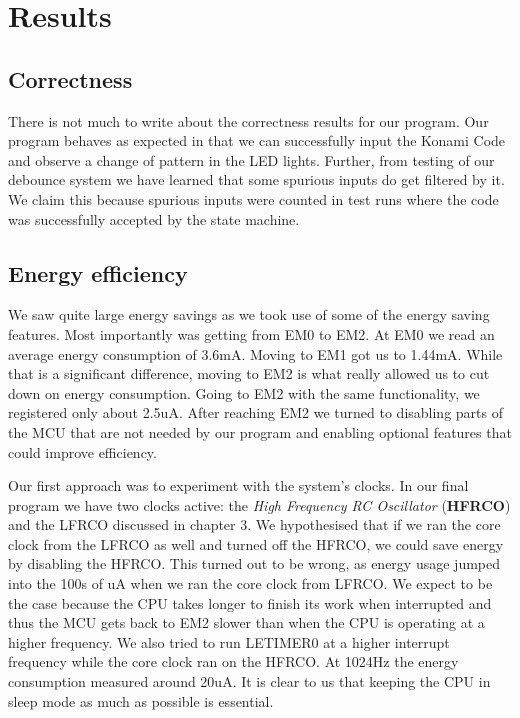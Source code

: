 \chapter{Results}

\section{Correctness}

There is not much to write about the correctness results for our program. Our
program behaves as expected in that we can successfully input the Konami Code
and observe a change of pattern in the LED lights. Further, from testing of our
debounce system we have learned that some spurious inputs do get filtered by it.
We claim this because spurious inputs were counted in test runs where the code
was successfully accepted by the state machine.

\section{Energy efficiency}

We saw quite large energy savings as we took use of some of the energy saving
features. Most importantly was getting from EM0 to EM2. At EM0 we read an
average energy consumption of 3.6mA. Moving to EM1 got us to 1.44mA. While that
is a significant difference, moving to EM2 is what really allowed us to cut down
on energy consumption. Going to EM2 with the same functionality, we registered
only about 2.5uA. After reaching EM2 we turned to disabling parts of the MCU
that are not needed by our program and enabling optional features that could
improve efficiency.

Our first approach was to experiment with the system's clocks. In our final
program we have two clocks active: the \emph{High Frequency RC Oscillator}
(\textbf{HFRCO}) and the LFRCO discussed in chapter 3. We hypothesised that if
we ran the core clock from the LFRCO as well and turned off the HFRCO, we could
save energy by disabling the HFRCO. This turned out to be wrong, as energy usage
jumped into the 100s of uA when we ran the core clock from LFRCO. We expect to
be the case because the CPU takes longer to finish its work when interrupted and
thus the MCU gets back to EM2 slower than when the CPU is operating at a higher
frequency. We also tried to run LETIMER0 at a higher interrupt frequency while
the core clock ran on the HFRCO. At 1024Hz the energy consumption measured
around 20uA. It is clear to us that keeping the CPU in sleep mode as much as
possible is essential.

